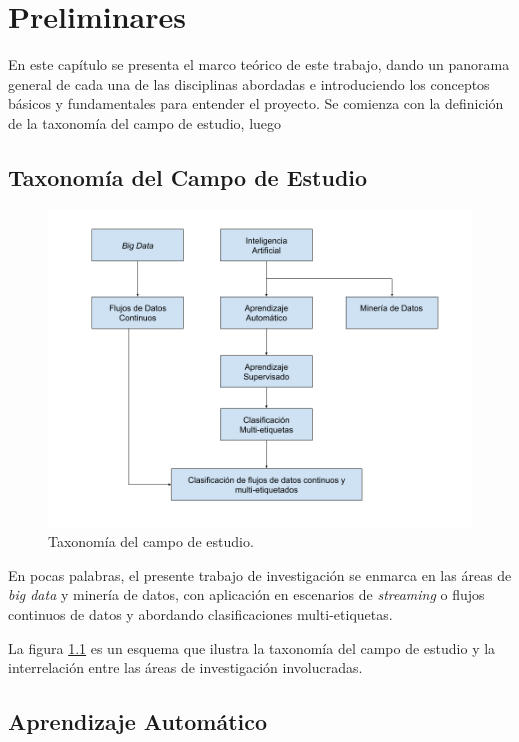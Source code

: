 \chapter{Preliminares}


En este capítulo se presenta el marco teórico de este trabajo, dando un panorama
general de cada una de las disciplinas abordadas e introduciendo los conceptos
básicos y fundamentales para entender el proyecto. Se comienza con la definición
de la taxonomía del campo de estudio, luego 

\section{Taxonomía del Campo de Estudio}

\begin{figure}
	\includegraphics[width=.9\linewidth]{figures/study_field_taxonomy_v2.png}
	\centering
	\caption{Taxonomía del campo de estudio.}
	\label{fig:campo_estudio}
\end{figure}

En pocas palabras, el presente trabajo de investigación se enmarca en las áreas
de \textit{big data} y minería de datos, con aplicación en escenarios de
\textit{streaming} o flujos continuos de datos y abordando clasificaciones
multi-etiquetas.

La figura \ref{fig:campo_estudio} es un esquema que ilustra la taxonomía del
campo de estudio y la interrelación entre las áreas de investigación
involucradas.

\section{Aprendizaje Automático}

